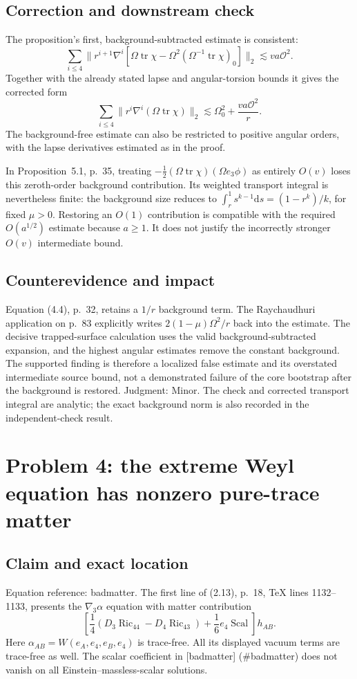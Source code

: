 \documentclass[10pt]{article}
\begin{document}
\subsection*{Correction and downstream check}
The proposition’s first, background-subtracted estimate is consistent: \[\sum_{i\le4}\|r^{i+1}\nabla^i
 [\Omega\operatorname{tr}\chi-\Omega^2(\Omega^{-1}\operatorname{tr}\chi)_0]\|_2
 \lesssim va\mathcal O^2.\] Together with the already stated lapse and angular-torsion bounds it gives the corrected form \[\sum_{i\le4}\|r^i\nabla^i(\Omega\operatorname{tr}\chi)\|_2
 \lesssim \Omega_0^2+\frac{va\mathcal O^2}{r}.\] The background-free estimate can also be restricted to positive angular orders, with the lapse derivatives estimated as in the proof.\par
In Proposition 5.1, p. 35, treating \(-\tfrac12(\Omega\operatorname{tr}\chi)(\Omega e_3\phi)\) as entirely \(O(v)\) loses this zeroth-order background contribution. Its weighted transport integral is nevertheless finite: the background size reduces to \(\int_r^1s^{k-1}\mathrm ds=(1-r^k)/k\), for fixed \(\mu>0\). Restoring an \(O(1)\) contribution is compatible with the required \(O(a^{1/2})\) estimate because \(a\ge1\). It does not justify the incorrectly stronger \(O(v)\) intermediate bound.\par
\subsection*{Counterevidence and impact}
Equation (4.4), p. 32, retains a \(1/r\) background term. The Raychaudhuri application on p. 83 explicitly writes \(2(1-\mu)\Omega^2/r\) back into the estimate. The decisive trapped-surface calculation uses the valid background-subtracted expansion, and the highest angular estimates remove the constant background. The supported finding is therefore a localized false estimate and its overstated intermediate source bound, not a demonstrated failure of the core bootstrap after the background is restored. Judgment: Minor. The check and corrected transport integral are analytic; the exact background norm is also recorded in the independent-check result.\par
\section*{Problem 4: the extreme Weyl equation has nonzero pure-trace matter}
\subsection*{Claim and exact location}
Equation reference: badmatter. The first line of (2.13), p. 18, TeX lines 1132–1133, presents the \(\nabla_3\alpha\) equation with matter contribution \[
 \left[\frac14(D_3\operatorname{Ric}_{44}-D_4\operatorname{Ric}_{43})
          +\frac16e_4\operatorname{Scal}\right]h_{AB}.\] Here \(\alpha_{AB}=W(e_A,e_4,e_B,e_4)\) is trace-free. All its displayed vacuum terms are trace-free as well. The scalar coefficient in [badmatter] (\#badmatter) does not vanish on all Einstein–massless-scalar solutions.\par
\end{document}
